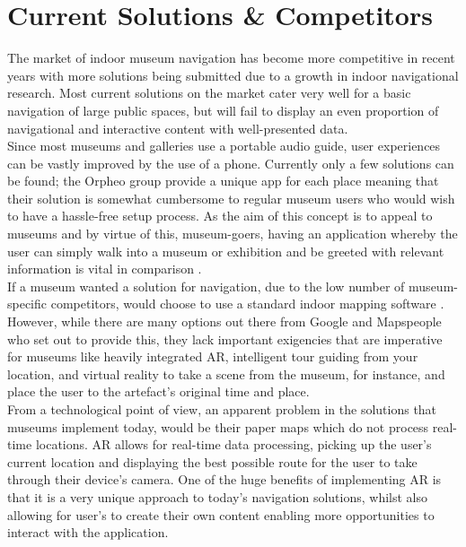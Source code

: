 
\section{Current Solutions \& Competitors}
The market of indoor museum navigation has become more competitive in recent years with more solutions being submitted due to a growth in indoor navigational research. Most current solutions on the market cater very well for a basic navigation of large public spaces, but will fail to display an even proportion of navigational and interactive content with well-presented data.\\

Since most museums and galleries use a portable audio guide, user experiences can be vastly improved by the use of a phone. Currently only a few solutions can be found; the Orpheo group \cite{orpheo} provide a unique app for each place meaning that their solution is somewhat cumbersome to regular museum users who would wish to have a hassle-free setup process. As the aim of this concept is to appeal to museums and by virtue of this, museum-goers, having an application whereby the user can simply walk into a museum or exhibition and be greeted with relevant information is vital in comparison \cite{microsoft}.\\

If a museum wanted a solution for navigation, due to the low number of museum-specific competitors, would choose to use a standard indoor mapping software \cite{engadget}. However, while there are many options out there from Google and Mapspeople \cite{mapspeople} who set out to provide this, they lack important exigencies that are imperative for museums like heavily integrated AR, intelligent tour guiding from your location, and virtual reality to take a scene from the museum, for instance, and place the user to the artefact's original time and place.\\

From a technological point of view, an apparent problem in the solutions that museums implement today, would be their paper maps which do not process real-time locations. AR allows for real-time data processing, picking up the user's current location and displaying the best possible route for the user to take through their device's camera. One of the huge benefits of implementing AR is that it is a very unique approach to today's navigation solutions, whilst also allowing for user's to create their own content enabling more opportunities to interact with the application.